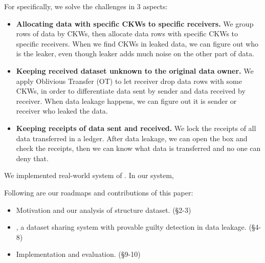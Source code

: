 For specifically, we solve the challenges in 3 aspects: 

\begin{itemize}
\item \textbf{Allocating data with specific CKWs to specific receivers.} We group rows of data by CKWs, then allocate data rows with specific CKWs to specific receivers. When we find CKWs in leaked data, we can figure out who is the leaker, even though leaker adds much noise on the other part of data.

\item \textbf{Keeping received dataset unknown to the original data owner.} We apply Oblivious Transfer (OT) to let receiver drop data rows with some CKWs, in order to differentiate data sent by sender and data received by receiver. When data leakage happens, we can figure out it is sender or receiver who leaked the data.

\item \textbf{Keeping receipts of data sent and received.} We lock the receipts of all data transferred in a ledger. After data leakage, we can open the box and check the receipts, then we can know what data is transferred and no one can deny that.
\end{itemize}

We implemented real-world system of \name. In our system, 

Following are our roadmaps and contributions of this paper:

\begin{itemize}
\item Motivation and our analysis of structure dataset. (\S2-3)
\item \name, a dataset sharing system with provable guilty detection in data leakage. (\S4-8)
\item Implementation and evaluation. (\S9-10)
\end{itemize}
